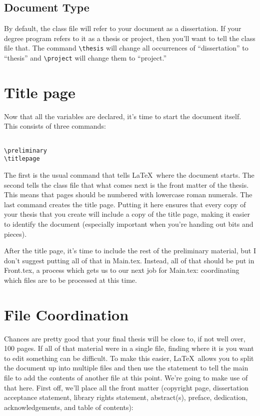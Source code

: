 \subsection{Document Type}
By default, the class file will refer to your document as a dissertation.  If your degree program refers to it as a thesis or project, then you'll want to tell the class file that.  The command \verb=\thesis= will change all occurrences of ``dissertation'' to ``thesis'' and \verb=\project= will change them to ``project.''

\section{Title page}

Now that all the variables are declared, it's time to start the document itself.  This consists of three commands:

\begin{verbatim}

\preliminary
\titlepage
\end{verbatim}

The first is the usual command that tells \LaTeX\ where the document starts.  The second tells the class file that what comes next is the front matter of the thesis.  This means that pages should be numbered with lowercase roman numerals.  The last command creates the title page.  Putting it here ensures that every copy of your thesis that you create will include a copy of the title page, making it easier to identify the document (especially important when you're handing out bits and pieces).

After the title page, it's time to include the rest of the preliminary material, but I don't suggest putting all of that in Main.tex.  Instead, all of that should be put in Front.tex, a process which gets us to our next job for Main.tex: coordinating which files are to be processed at this time.

\section{File Coordination}
Chances are pretty good that your final thesis will be close to, if not well over, 100 pages.  If all of that material were in a single file, finding where it is you want to edit something can be difficult.  To make this easier, \LaTeX\ allows you to split the document up into multiple files and then use the \verb== statement to tell the main file to add the contents of another file at this point.  We're going to make use of that here.  First off, we'll place all the front matter (copyright page, dissertation acceptance statement, library rights statement, abstract(s), preface, dedication, acknowledgements, and table of contents):

